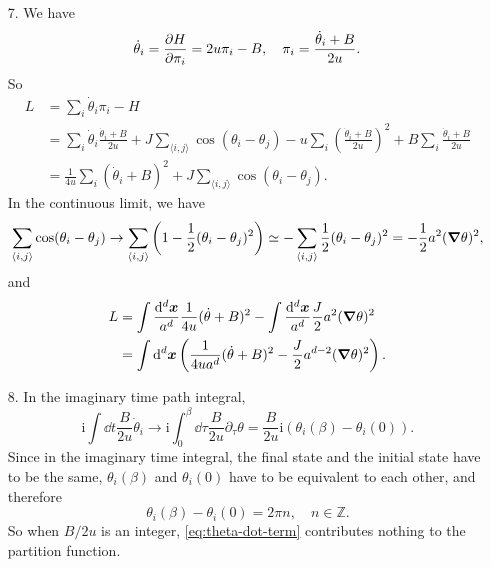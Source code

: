 \documentclass[hyperref, a4paper]{article}
\newcommand*{\ii}{\mathrm{i}}
\newcommand*{\pair}[1]{\langle #1 \rangle}
\begin{document}
\begin{itemize}
\item[7.] We have 
\begin{equation}
    \dot{\theta}_i = \pdv{H}{\pi_i} = 2 u \pi_i - B, \quad 
    \pi_i = \frac{\dot{\theta}_i + B}{2u}.
\end{equation}
So
\begin{equation}
    \begin{aligned}
        L &= \sum_i \dot{\theta}_i \pi_i - H \\
        &= \sum_i \dot{\theta}_i \frac{\dot{\theta}_i + B}{2u} 
        + J \sum_{\pair{i, j}} \cos(\theta_i - \theta_j) 
        - u \sum_i \left( \frac{\dot{\theta}_i + B}{2u} \right)^2
        + B \sum_i \frac{\dot{\theta}_i + B}{2u} \\
        &= \frac{1}{4u} \sum_i (\dot{\theta}_i + B)^2 + J \sum_{\pair{i, j}} \cos(\theta_i - \theta_j) .
    \end{aligned}
\end{equation}
In the continuous limit, we have 
\begin{equation}
    \sum_{\pair{i, j}} \cos(\theta_i - \theta_j) 
    \to \sum_{\pair{i, j}} \left( 1 - \frac{1}{2} (\theta_i - \theta_j)^2 \right) 
    \simeq - \sum_{\pair{i, j}} \frac{1}{2} (\theta_i - \theta_j)^2 = - \frac{1}{2} a^2 (\grad{\theta})^2,
\end{equation}
and 
\begin{equation}
    \begin{aligned}
        L &= \int \frac{\dd[d]{\vb*{x}}}{a^d} \frac{1}{4 u} (\dot{\theta} + B)^2 
        - \int \frac{\dd[d]{\vb*{x}}}{a^d} \frac{J}{2} a^2 (\grad{\theta})^2  \\
        &= \int \dd[d]{\vb*{x}} \left(
            \frac{1}{4 u a^d} (\dot{\theta} + B)^2
            - \frac{J}{2} a^{d-2} (\grad{\theta})^2
        \right).
    \end{aligned}
\end{equation}

\item[8.] In the imaginary time path integral,
\begin{equation}
    \ii \int \dd{t} \frac{B}{2u} \dot{\theta}_i \longrightarrow 
    \ii \int_0^{\beta} \dd{\tau} \frac{B}{2u} \partial_\tau \theta 
    = \frac{B}{2u} \ii (\theta_i(\beta) - \theta_i(0)).
    \label{eq:theta-dot-term}
\end{equation}
Since in the imaginary time integral,
the final state and the initial state have to be the same,
$\theta_i(\beta)$ and $\theta_i(0)$ have to be equivalent to each other,
and therefore 
\begin{equation}
    \theta_i(\beta) - \theta_i(0) = 2\pi n, \quad n \in \mathbb{Z}.
\end{equation}
So when $B / 2u$ is an integer, \eqref{eq:theta-dot-term} contributes nothing to the partition function.

\end{itemize}
\end{document}
